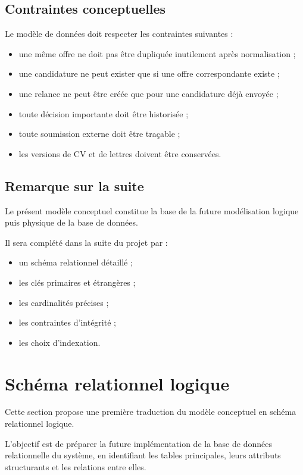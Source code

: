 \documentclass[11pt,a4paper]{article}
\begin{document}
\subsection{Contraintes conceptuelles}

Le modèle de données doit respecter les contraintes suivantes :

\begin{itemize}
    \item une même offre ne doit pas être dupliquée inutilement après normalisation ;
    \item une candidature ne peut exister que si une offre correspondante existe ;
    \item une relance ne peut être créée que pour une candidature déjà envoyée ;
    \item toute décision importante doit être historisée ;
    \item toute soumission externe doit être traçable ;
    \item les versions de CV et de lettres doivent être conservées.
\end{itemize}

\subsection{Remarque sur la suite}

Le présent modèle conceptuel constitue la base de la future modélisation logique puis physique de la base de données.

Il sera complété dans la suite du projet par :

\begin{itemize}
    \item un schéma relationnel détaillé ;
    \item les clés primaires et étrangères ;
    \item les cardinalités précises ;
    \item les contraintes d’intégrité ;
    \item les choix d’indexation.
\end{itemize}

\section{Schéma relationnel logique}

Cette section propose une première traduction du modèle conceptuel en schéma relationnel logique.

L’objectif est de préparer la future implémentation de la base de données relationnelle du système, en identifiant les tables principales, leurs attributs structurants et les relations entre elles.
\end{document}
